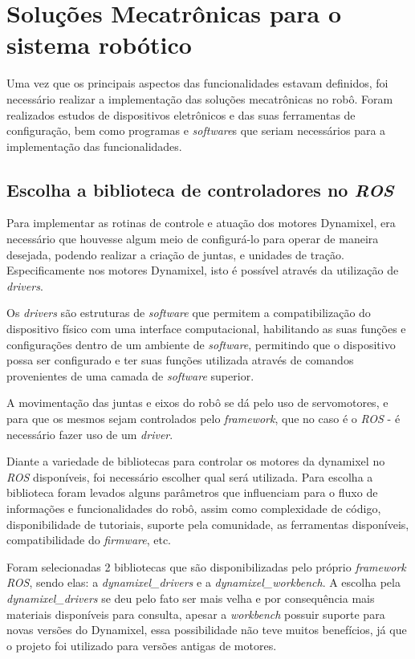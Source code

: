 \section{Soluções Mecatrônicas para o sistema robótico}\label{sec:sol_sis}
Uma vez que os principais aspectos das funcionalidades estavam definidos, foi necessário realizar a implementação das soluções mecatrônicas no robô. Foram realizados estudos de dispositivos eletrônicos e das suas ferramentas de configuração, bem como programas e \textit{software}s que seriam necessários para a implementação das funcionalidades.

\subsection{Escolha a biblioteca de controladores no \textit{ROS}}\label{sec:contr_ros}
Para implementar as rotinas de controle e atuação dos motores Dynamixel, era necessário que houvesse algum meio de configurá-lo para operar de maneira desejada, podendo realizar a criação de juntas, e unidades de tração. Especificamente nos motores Dynamixel, isto é possível através da utilização de \textit{drivers}.

Os \textit{drivers} são estruturas de \textit{software} que permitem a compatibilização do dispositivo físico com uma interface computacional, habilitando as suas funções e configurações dentro de um ambiente de \textit{software}, permitindo que o dispositivo possa ser configurado e ter suas funções utilizada através de comandos provenientes de uma camada de \textit{software} superior.

A movimentação das juntas e eixos do robô se dá pelo uso de servomotores, e para que os mesmos sejam controlados pelo \textit{framework}, que no caso é o \textit{ROS} - é necessário fazer uso de um \textit{driver}.

Diante a variedade de bibliotecas para controlar os motores da dynamixel no \textit{ROS} disponíveis, foi necessário escolher qual será utilizada. Para escolha a biblioteca foram levados alguns parâmetros que influenciam para o fluxo de informações e funcionalidades do robô, assim como complexidade de código, disponibilidade de tutoriais, suporte pela comunidade, as ferramentas disponíveis, compatibilidade do \textit{firmware}, etc.

Foram selecionadas 2 bibliotecas que são disponibilizadas pelo próprio \textit{framework} \textit{ROS}, sendo elas: a  \textit{dynamixel\_drivers} e a \textit{dynamixel\_workbench}. A escolha pela \textit{dynamixel\_drivers} se deu pelo fato ser mais velha e por consequência mais materiais disponíveis para consulta, apesar a \textit{workbench} possuir suporte para novas versões do Dynamixel, essa possibilidade não teve muitos benefícios, já que o projeto foi utilizado para versões antigas de motores. 

